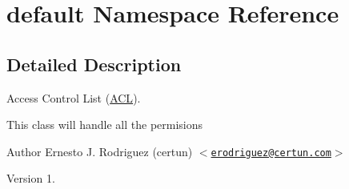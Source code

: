 \hypertarget{namespacedefault}{\section{default \-Namespace \-Reference}
\label{namespacedefault}
}


\subsection{\-Detailed \-Description}
\-Access \-Control \-List (\hyperlink{class_a_c_l}{\-A\-C\-L}).

\-This class will handle all the permisions \begin{DoxyAuthor}{\-Author}
\-Ernesto \-J. \-Rodriguez (certun) $<$\href{mailto:erodriguez@certun.com}{\tt erodriguez@certun.\-com}$>$ 
\end{DoxyAuthor}
\begin{DoxyVersion}{\-Version}
1. 
\end{DoxyVersion}
